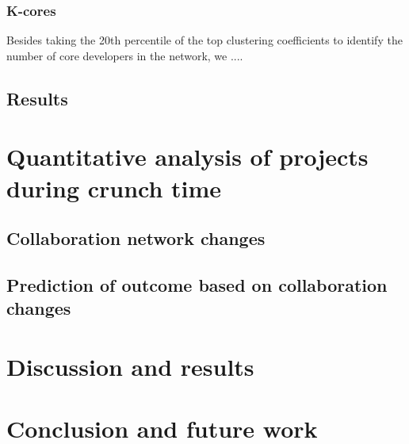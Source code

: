 \subsubsection{K-cores}
Besides taking the 20th percentile of the top clustering coefficients to identify the number of core developers in the network, we .... \cite{batageljAlgorithmCoresDecomposition2003}
\subsection{Results}


\section{Quantitative analysis of projects during crunch time}
\subsection{Collaboration network changes}
\subsection{Prediction of outcome based on collaboration changes}

\section{Discussion and results}
\section{Conclusion and future work}
